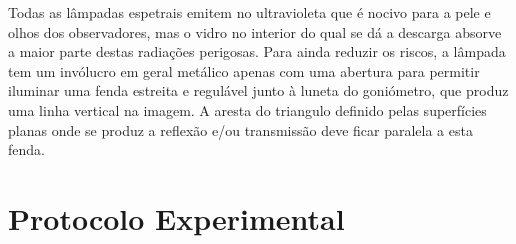 \documentclass[a4paper,12pt]{article}  %
\newcommand{\ud}{\,\mathrm{d}}
\begin{document}
Todas as lâmpadas espetrais emitem no ultravioleta que é nocivo para a pele e olhos dos observadores, mas o vidro no interior do qual se dá a descarga absorve a maior parte destas radiações perigosas. Para ainda reduzir os riscos, a lâmpada tem um invólucro em geral metálico apenas com uma abertura para permitir iluminar uma fenda estreita e regulável junto à luneta do goniómetro, que produz uma linha vertical na imagem.  A aresta do triangulo  definido pelas superfícies planas onde se produz a reflexão e/ou transmissão deve ficar paralela a esta fenda.



\section{\sf Protocolo Experimental}
\end{document}
